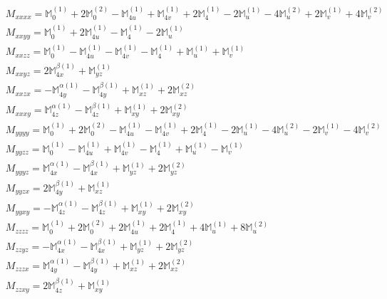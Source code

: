 \documentclass[fleqn,8pt,landscape]{jsarticle}
\begin{document}
\begin{align*}
& M_{xxxx} = \mathbb{M}_{0}^{(1)} + 2 \mathbb{M}_{0}^{(2)} - \mathbb{M}_{4u}^{(1)} + \mathbb{M}_{4v}^{(1)} + 2 \mathbb{M}_{4}^{(1)} - 2 \mathbb{M}_{u}^{(1)} - 4 \mathbb{M}_{u}^{(2)} + 2 \mathbb{M}_{v}^{(1)} + 4 \mathbb{M}_{v}^{(2)} \\
& M_{xxyy} = \mathbb{M}_{0}^{(1)} + 2 \mathbb{M}_{4u}^{(1)} - \mathbb{M}_{4}^{(1)} - 2 \mathbb{M}_{u}^{(1)} \\
& M_{xxzz} = \mathbb{M}_{0}^{(1)} - \mathbb{M}_{4u}^{(1)} - \mathbb{M}_{4v}^{(1)} - \mathbb{M}_{4}^{(1)} + \mathbb{M}_{u}^{(1)} + \mathbb{M}_{v}^{(1)} \\
& M_{xxyz} = 2 \mathbb{M}_{4x}^{\beta(1)} + \mathbb{M}_{yz}^{(1)} \\
& M_{xxzx} = - \mathbb{M}_{4y}^{\alpha(1)} - \mathbb{M}_{4y}^{\beta(1)} + \mathbb{M}_{xz}^{(1)} + 2 \mathbb{M}_{xz}^{(2)} \\
& M_{xxxy} = \mathbb{M}_{4z}^{\alpha(1)} - \mathbb{M}_{4z}^{\beta(1)} + \mathbb{M}_{xy}^{(1)} + 2 \mathbb{M}_{xy}^{(2)} \\
& M_{yyyy} = \mathbb{M}_{0}^{(1)} + 2 \mathbb{M}_{0}^{(2)} - \mathbb{M}_{4u}^{(1)} - \mathbb{M}_{4v}^{(1)} + 2 \mathbb{M}_{4}^{(1)} - 2 \mathbb{M}_{u}^{(1)} - 4 \mathbb{M}_{u}^{(2)} - 2 \mathbb{M}_{v}^{(1)} - 4 \mathbb{M}_{v}^{(2)} \\
& M_{yyzz} = \mathbb{M}_{0}^{(1)} - \mathbb{M}_{4u}^{(1)} + \mathbb{M}_{4v}^{(1)} - \mathbb{M}_{4}^{(1)} + \mathbb{M}_{u}^{(1)} - \mathbb{M}_{v}^{(1)} \\
& M_{yyyz} = \mathbb{M}_{4x}^{\alpha(1)} - \mathbb{M}_{4x}^{\beta(1)} + \mathbb{M}_{yz}^{(1)} + 2 \mathbb{M}_{yz}^{(2)} \\
& M_{yyzx} = 2 \mathbb{M}_{4y}^{\beta(1)} + \mathbb{M}_{xz}^{(1)} \\
& M_{yyxy} = - \mathbb{M}_{4z}^{\alpha(1)} - \mathbb{M}_{4z}^{\beta(1)} + \mathbb{M}_{xy}^{(1)} + 2 \mathbb{M}_{xy}^{(2)} \\
& M_{zzzz} = \mathbb{M}_{0}^{(1)} + 2 \mathbb{M}_{0}^{(2)} + 2 \mathbb{M}_{4u}^{(1)} + 2 \mathbb{M}_{4}^{(1)} + 4 \mathbb{M}_{u}^{(1)} + 8 \mathbb{M}_{u}^{(2)} \\
& M_{zzyz} = - \mathbb{M}_{4x}^{\alpha(1)} - \mathbb{M}_{4x}^{\beta(1)} + \mathbb{M}_{yz}^{(1)} + 2 \mathbb{M}_{yz}^{(2)} \\
& M_{zzzx} = \mathbb{M}_{4y}^{\alpha(1)} - \mathbb{M}_{4y}^{\beta(1)} + \mathbb{M}_{xz}^{(1)} + 2 \mathbb{M}_{xz}^{(2)} \\
& M_{zzxy} = 2 \mathbb{M}_{4z}^{\beta(1)} + \mathbb{M}_{xy}^{(1)} \\

\end{align*}
\end{document}
